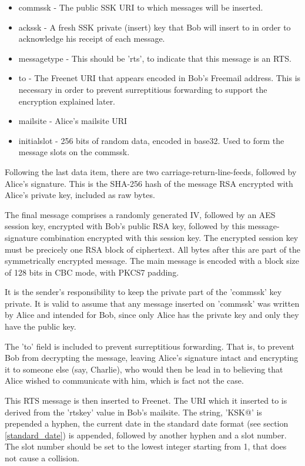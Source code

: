\documentclass[12pt,a4paper]{article}
\begin{document}
\begin{itemize}
\item commssk - The public SSK URI to which messages will be inserted.
\item ackssk - A fresh SSK private (insert) key that Bob will insert to in order to acknowledge his receipt of each message.
\item messagetype - This should be 'rts', to indicate that this message is an RTS.
\item to - The Freenet URI that appears encoded in Bob's Freemail address. This is necessary in order to prevent surreptitious forwarding to support the encryption explained later.
\item mailsite - Alice's mailsite URI
\item initialslot - 256 bits of random data, encoded in base32. Used to form the message slots on the commssk.
\end{itemize}

Following the last data item, there are two carriage-return-line-feeds, followed by Alice's signature. This is the SHA-256 hash of the message RSA encrypted with Alice's private key, included as raw bytes.

The final message comprises a randomly generated IV, followed by an AES session key, encrypted with Bob's public RSA key, followed by this message-signature combination encrypted with this session key. The encrypted session key must be precicely one RSA block of ciphertext. All bytes after this are part of the symmetrically encrypted message. The main message is encoded with a block size of 128 bits in CBC mode, with PKCS7 padding.

It is the sender's responsibility to keep the private part of the 'commssk' key private. It is valid to assume that any message inserted on 'commssk' was written by Alice and intended for Bob, since only Alice has the private key and only they have the public key.

The 'to' field is included to prevent surreptitious forwarding. That is, to prevent Bob from decrypting the message, leaving Alice's signature intact and encrypting it to someone else (say, Charlie), who would then be lead in to believing that Alice wished to communicate with him, which is fact not the case.

This RTS message is then inserted to Freenet. The URI which it inserted to is derived from the 'rtskey' value in Bob's mailsite. The string, 'KSK@' is prepended a hyphen, the current date in the standard date format (see section \ref{standard_date}) is appended, followed by another hyphen and a slot number. The slot number should be set to the lowest integer starting from 1, that does not cause a collision.
\end{document}
